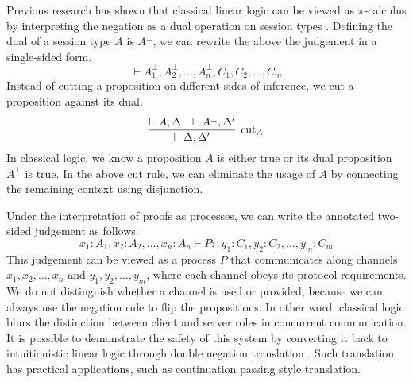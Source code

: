 \documentclass[12pt, openany]{memoir}
\begin{document}
Previous research has shown that classical linear logic can be viewed as $\pi$-calculus
by interpreting the negation as a dual operation on session types \cite{Wadler2012}. 
Defining the dual of a session type $A$ is $A^{\bot}$, we can rewrite the above the judgement in a single-sided form.
\[
  \vdash A_1^\bot, A_2^\bot, \ldots, A_n^\bot, C_1, C_2, \ldots, C_m
\]
Instead of cutting a proposition on different sides of inference, we cut a proposition against its dual.
\[
  \infer[\text{cut}_A]{\vdash \Delta, \Delta'}{
    \vdash A, \Delta
    &
    \vdash A^\bot, \Delta'
  }
\]
In classical logic, we know a proposition $A$ is either true or its dual proposition $A^\bot$ is true.
In the above cut rule, we can eliminate the usage of $A$ by connecting the remaining context using disjunction. 

Under the interpretation of proofs as processes, we can write the annotated two-sided judgement as follows.
\[
  x_1 : A_1, x_2 : A_2, \ldots, x_n : A_n \vdash P :: y_1 : C_1, y_2 : C_2, \ldots, y_m : C_m
\]
This judgement can be viewed as a process $P$ that communicates along channels $x_1, x_2, \ldots, x_n$
and $y_1, y_2, \ldots, y_m$, where each channel obeys its protocol requirements.
We do not distinguish whether a channel is used or provided, because we can always use the negation rule to flip the propositions.
In other word, classical logic blurs the distinction between client and server roles in concurrent communication.
It is possible to demonstrate the safety of this system by converting it back to intuitionistic linear logic through double negation translation \cite{Friedman1978}.
Such translation has practical applications, such as continuation passing style translation.
\end{document}
